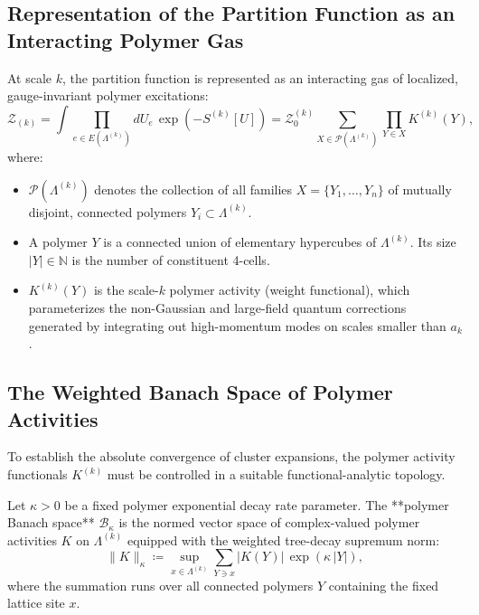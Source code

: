 \subsection{Representation of the Partition Function as an Interacting Polymer Gas}
\label{subsec:polymer_gas_rep}

At scale $k$, the partition function is represented as an interacting gas of localized, gauge-invariant polymer excitations:
\begin{equation}
\label{eq:polymer_gas_partition}
\mathcal{Z}_{(k)} = \int \prod_{e \in E(\Lambda^{(k)})} dU_e \, \exp\left( -S^{(k)}[U] \right) = \mathcal{Z}_0^{(k)} \sum_{X \in \mathcal{P}(\Lambda^{(k)})} \prod_{Y \in X} K^{(k)}(Y),
\end{equation}
where:
\begin{itemize}
    \item $\mathcal{P}(\Lambda^{(k)})$ denotes the collection of all families $X = \{Y_1, \dots, Y_n\}$ of mutually disjoint, connected polymers $Y_i \subset \Lambda^{(k)}$.
    \item A polymer $Y$ is a connected union of elementary hypercubes of $\Lambda^{(k)}$. Its size $|Y| \in \mathbb{N}$ is the number of constituent 4-cells.
    \item $K^{(k)}(Y)$ is the scale-$k$ polymer activity (weight functional), which parameterizes the non-Gaussian and large-field quantum corrections generated by integrating out high-momentum modes on scales smaller than $a_k$.
\end{itemize}

\subsection{The Weighted Banach Space of Polymer Activities}
\label{subsec:banach_space_b_kappa}

To establish the absolute convergence of cluster expansions, the polymer activity functionals $K^{(k)}$ must be controlled in a suitable functional-analytic topology.

\begin{definition}
\label{def:polymer_banach_space_ch14}
Let $\kappa > 0$ be a fixed polymer exponential decay rate parameter. The **polymer Banach space** $\mathcal{B}_\kappa$ is the normed vector space of complex-valued polymer activities $K$ on $\Lambda^{(k)}$ equipped with the weighted tree-decay supremum norm:
\begin{equation}
\label{eq:polymer_banach_norm}
\|K\|_\kappa \coloneqq \sup_{x \in \Lambda^{(k)}} \sum_{Y \ni x} \left| K(Y) \right| \, \exp\left( \kappa \, |Y| \right),
\end{equation}
where the summation runs over all connected polymers $Y$ containing the fixed lattice site $x$.
\end{definition}

